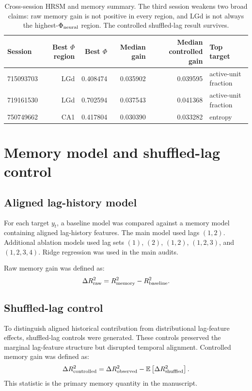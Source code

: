 \documentclass[11pt]{article}
\begin{document}
\begin{table}[t]
\centering
\caption{Cross-session HRSM and memory summary. The third session weakens two broad claims: raw memory gain is not positive in every region, and LGd is not always the highest-\(\Phi_{\rm neural}\) region. The controlled shuffled-lag result survives.}
\label{tab:session-summary}
\begin{tabular}{lrrrrl}
\toprule
Session & Best \(\Phi\) region & Best \(\Phi\) & Median gain & Median controlled gain & Top target \\
\midrule
715093703 & LGd & 0.408474 & 0.035902 & 0.039595 & active-unit fraction \\
719161530 & LGd & 0.702594 & 0.037543 & 0.041368 & active-unit fraction \\
750749662 & CA1 & 0.417804 & 0.030390 & 0.033282 & entropy \\
\bottomrule
\end{tabular}
\end{table}

\section{Memory model and shuffled-lag control}

\subsection{Aligned lag-history model}

For each target \(y_t\), a baseline model was compared against a memory model containing aligned lag-history features. The main model used lags \((1,2)\). Additional ablation models used lag sets \((1)\), \((2)\), \((1,2)\), \((1,2,3)\), and \((1,2,3,4)\). Ridge regression was used in the main audits.

Raw memory gain was defined as:
\[
\Delta R^2_{\rm raw}
=
R^2_{\rm memory}
-
R^2_{\rm baseline}.
\]

\subsection{Shuffled-lag control}

To distinguish aligned historical contribution from distributional lag-feature effects, shuffled-lag controls were generated. These controls preserved the marginal lag-feature structure but disrupted temporal alignment. Controlled memory gain was defined as:
\[
\Delta R^2_{\rm controlled}
=
\Delta R^2_{\rm observed}
-
\mathbb{E}\left[\Delta R^2_{\rm shuffled}\right].
\]
This statistic is the primary memory quantity in the manuscript.
\end{document}
